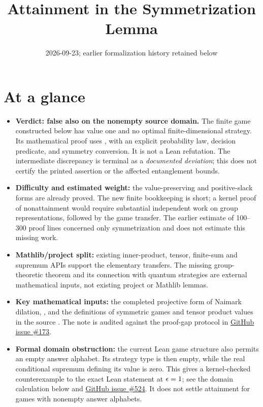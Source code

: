 \documentclass[11pt]{article}
\title{Attainment in the Symmetrization Lemma}
\author{}
\date{2026-09-23; earlier formalization history retained below}
\renewcommand{\ghissue}[1]{%
  \href{https://github.com/Dengnifer/MIPStarRE-QPBT/issues/#1}{GitHub issue \##1}}
\begin{document}
\maketitle

\section{At a glance}

\begin{itemize}
  \item \textbf{Verdict: false also on the nonempty source domain.}
  The finite game constructed below has value one and no optimal
  finite-dimensional strategy. Its mathematical proof uses
  \cite[Theorem~1.1]{Slofstra2017Nonclosure}, with an explicit probability
  law, decision predicate, and symmetry conversion. It is not a Lean
  refutation. The intermediate discrepancy is terminal as a
  \emph{documented deviation}; this does not certify the printed assertion or
  the affected entanglement bounds.
  \item \textbf{Difficulty and estimated weight:} the value-preserving and
  positive-slack forms are already proved. The new finite bookkeeping is
  short; a kernel proof of nonattainment would require substantial independent
  work on group representations, followed by the game transfer. The earlier
  estimate of 100--300 proof lines concerned only symmetrization and does not
  estimate this missing work.
  \item \textbf{Mathlib/project split:} existing inner-product, tensor,
  finite-sum and supremum APIs support the elementary transfers. The missing
  group-theoretic theorem and its connection with quantum strategies are
  external mathematical inputs, not existing project or Mathlib lemmas.
  \item \textbf{Key mathematical inputs:} the completed projective form of
  Naimark dilation, \cite[Theorem~5.1]{Ji2020LowIndividualDegree}, and the
  definitions of symmetric games and tensor product values in the source
  \cite[Section~5]{Ji2020MIPStar}.  The note is audited against the
  proof-gap protocol in \ghissue{173}.
  \item \textbf{Formal domain obstruction:} the current Lean game structure
  also permits an empty answer alphabet.  Its strategy type is then empty,
  while the real conditional supremum defining its value is zero.  This gives
  a kernel-checked counterexample to the exact Lean statement at $\epsilon=1$;
  see the domain calculation below and \ghissue{524}.  It does not settle
  attainment for games with nonempty answer alphabets.
\end{itemize}
\end{document}
